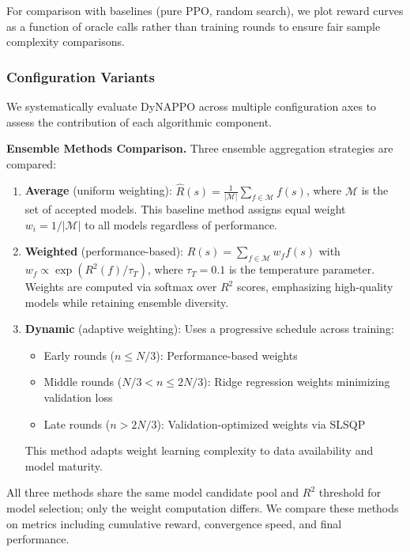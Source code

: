 \documentclass[conference]{IEEEtran}
\begin{document}
For comparison with baselines (pure PPO, random search), we plot reward curves as a function of oracle calls rather than training rounds to ensure fair sample complexity comparisons.

\subsubsection{Configuration Variants}

We systematically evaluate DyNAPPO across multiple configuration axes to assess the contribution of each algorithmic component.

\textbf{Ensemble Methods Comparison.} Three ensemble aggregation strategies are compared:
\begin{enumerate}
    \item \textbf{Average} (uniform weighting): $\hat{R}(s) = \frac{1}{|\mathcal{M}|}\sum_{f \in \mathcal{M}} f(s)$, where $\mathcal{M}$ is the set of accepted models. This baseline method assigns equal weight $w_i = 1/|\mathcal{M}|$ to all models regardless of performance.

    \item \textbf{Weighted} (performance-based): $\hat{R}(s) = \sum_{f \in \mathcal{M}} w_f f(s)$ with $w_f \propto \exp(R^2(f) / \tau_T)$, where $\tau_T = 0.1$ is the temperature parameter. Weights are computed via softmax over $R^2$ scores, emphasizing high-quality models while retaining ensemble diversity.

    \item \textbf{Dynamic} (adaptive weighting): Uses a progressive schedule across training:
    \begin{itemize}
        \item Early rounds ($n \leq N/3$): Performance-based weights
        \item Middle rounds ($N/3 < n \leq 2N/3$): Ridge regression weights minimizing validation loss
        \item Late rounds ($n > 2N/3$): Validation-optimized weights via SLSQP
    \end{itemize}
    This method adapts weight learning complexity to data availability and model maturity.
\end{enumerate}

All three methods share the same model candidate pool and $R^2$ threshold for model selection; only the weight computation differs. We compare these methods on metrics including cumulative reward, convergence speed, and final performance.
\end{document}
